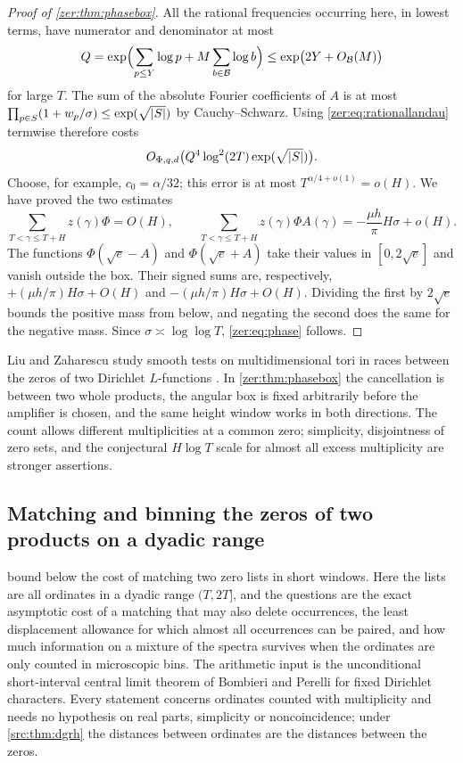 \begin{proof}[Proof of \cref{zer:thm:phasebox}]
All the rational frequencies occurring here, in lowest terms, have numerator and
denominator at most
\[
 Q=\exp\Bigl(\sum_{p\le Y}\log p+M\sum_{b\in\mathcal B}\log b\Bigr)
 \le\exp\bigl(2Y+O_{\mathcal B}(M)\bigr)
\]
for large $T$. The sum of the absolute Fourier coefficients of $A$ is at most
$\prod_{p\in S}(1+w_p/\sigma)\le\exp(\sqrt{\lvert S\rvert})$ by Cauchy--Schwarz. Using
\eqref{zer:eq:rationallandau} termwise therefore costs
\[
 O_{\Phi,q,d}\bigl(Q^4\log^2(2T)\exp(\sqrt{\lvert S\rvert})\bigr).
\]
Choose, for example, $c_0=\alpha/32$; this error is at most $T^{\alpha/4+o(1)}=o(H)$. We have proved the two estimates
\[
 \sum_{T<\gamma\le T+H}z(\gamma)\Phi=O(H),\qquad
 \sum_{T<\gamma\le T+H}z(\gamma)\Phi A(\gamma)=-\frac{\mu h}\pi H\sigma+o(H).
\]
The functions $\Phi(\sqrt e-A)$ and $\Phi(\sqrt e+A)$ take their values in
$[0,2\sqrt e]$ and vanish outside the box. Their signed sums are, respectively,
$+(\mu h/\pi)H\sigma+O(H)$ and $-(\mu h/\pi)H\sigma+O(H)$. Dividing the first by $2\sqrt e$
bounds the positive mass from below, and negating the second does the same for the
negative mass. Since $\sigma\asymp\log\log T$, \eqref{zer:eq:phase} follows.
\end{proof}

Liu and Zaharescu study smooth tests on multidimensional tori in races between the zeros of
two Dirichlet $L$-functions \cite{LiuZaharescu2021Races}. In \cref{zer:thm:phasebox} the
cancellation is between two whole products, the angular box is fixed arbitrarily before the
amplifier is chosen, and the same height window works in both directions. The count allows
different multiplicities at a common zero; simplicity, disjointness of zero sets, and the
conjectural $H\log T$ scale for almost all excess multiplicity are stronger assertions.

\subsection{Matching and binning the zeros of two products on a dyadic range}\label{chz:sec:matching}

 bound below the cost of matching two zero lists in
short windows. Here the lists are all ordinates in a dyadic range $(T,2T]$, and the questions are the exact
asymptotic cost of a matching that may also delete occurrences, the least displacement allowance for which
almost all occurrences can be paired, and how much information on a mixture of the spectra survives when the
ordinates are only counted in microscopic bins. The arithmetic input is the unconditional short-interval
central limit theorem of Bombieri and Perelli \cite{BombieriPerelli1998Distinct} for fixed Dirichlet
characters. Every statement concerns ordinates counted with multiplicity and needs no hypothesis on real
parts, simplicity or noncoincidence; under \cref{src:thm:dgrh} the distances between ordinates are the
distances between the zeros.

